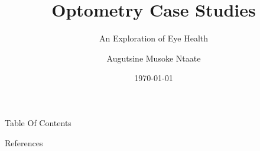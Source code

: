 \documentclass[
                14pt,
                ]{beamer}
\title{Optometry Case Studies}
\subtitle{An Exploration of Eye Health}
\author{Augutsine Musoke Ntaate}
\institute{OptoCase}
\date{\today}
\begin{document}
\begin{frame}
  \titlepage
\end{frame}

\begin{frame}[shrink=20]{Table Of Contents}

    \tiny
    \begin{multicols}{2}
    \tableofcontents
    \end{multicols}

\end{frame}



























\begin{frame}[shrink=60]{References}

    \printbibliography
    

\end{frame}


\end{document}
